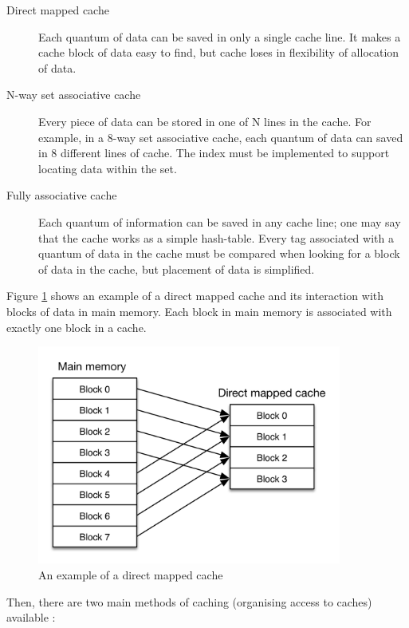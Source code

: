 \begin{description}
  \item[Direct mapped cache] Each quantum of data can be saved in only a single cache line. It makes a cache block of data easy to find, but cache loses in flexibility of allocation of data.
  \item[N-way set associative cache] Every piece of data can be stored in one of N lines in the cache. For example, in a 8-way set associative cache, each quantum of data can saved in 8 different lines of cache. The index must be implemented to support locating data within the set.
  \item[Fully associative cache] Each quantum of information can be saved in any cache line; one may say that the cache works as a simple hash-table. Every tag associated with a quantum of data in the cache must be compared when looking for a block of data in the cache, but placement of data is simplified.
\end{description}

Figure \ref{cache_diagram} shows an example of a direct mapped cache and its interaction with blocks of data in main memory. Each block in main memory is associated with exactly one block in a cache.

\begin{figure}[ht!]
\centering
\includegraphics[width=100mm]{3/cache_diagram.png}
\caption{An example of a direct mapped cache}
\label{cache_diagram}
\end{figure}

Then, there are two main methods of caching (organising access to caches) available \cite{Intel2014}:

